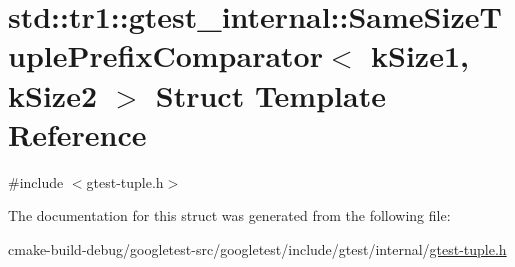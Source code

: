 \hypertarget{structstd_1_1tr1_1_1gtest__internal_1_1SameSizeTuplePrefixComparator}{}\section{std\+::tr1\+::gtest\+\_\+internal\+::Same\+Size\+Tuple\+Prefix\+Comparator$<$ k\+Size1, k\+Size2 $>$ Struct Template Reference}
\label{structstd_1_1tr1_1_1gtest__internal_1_1SameSizeTuplePrefixComparator}


{\ttfamily \#include $<$gtest-\/tuple.\+h$>$}



The documentation for this struct was generated from the following file\+:\begin{DoxyCompactItemize}
\item 
cmake-\/build-\/debug/googletest-\/src/googletest/include/gtest/internal/\mbox{\hyperlink{gtest-tuple_8h}{gtest-\/tuple.\+h}}\end{DoxyCompactItemize}
